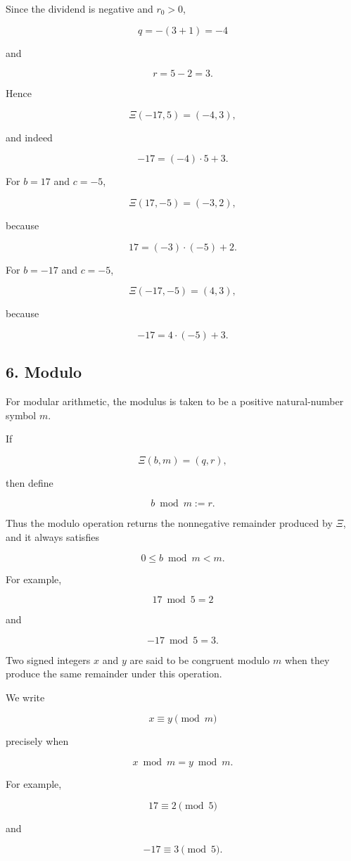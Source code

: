 \documentclass[12pt]{article}
\begin{document}
Since the dividend is negative and \(r_0>0\),

\[
q=-(3+1)=-4
\]

and

\[
r=5-2=3.
\]

Hence

\[
\Xi(-17,5)=(-4,3),
\]

and indeed

\[
-17=(-4)\cdot5+3.
\]

For \(b=17\) and \(c=-5\),

\[
\Xi(17,-5)=(-3,2),
\]

because

\[
17=(-3)\cdot(-5)+2.
\]

For \(b=-17\) and \(c=-5\),

\[
\Xi(-17,-5)=(4,3),
\]

because

\[
-17=4\cdot(-5)+3.
\]

\subsection*{6. Modulo}

For modular arithmetic, the modulus is taken to be a positive natural-number symbol \(m\).

If

\[
\Xi(b,m)=(q,r),
\]

then define

\[
\boxed{
b\bmod m:=r.
}
\]

Thus the modulo operation returns the nonnegative remainder produced by \(\Xi\), and it always satisfies

\[
\boxed{
0\leq b\bmod m<m.
}
\]

For example,

\[
17\bmod5=2
\]

and

\[
-17\bmod5=3.
\]

Two signed integers \(x\) and \(y\) are said to be congruent modulo \(m\) when they produce the same remainder under this operation.

We write

\[
\boxed{
x\equiv y\pmod m
}
\]

precisely when

\[
x\bmod m=y\bmod m.
\]

For example,

\[
17\equiv2\pmod5
\]

and

\[
-17\equiv3\pmod5.
\]
\end{document}
